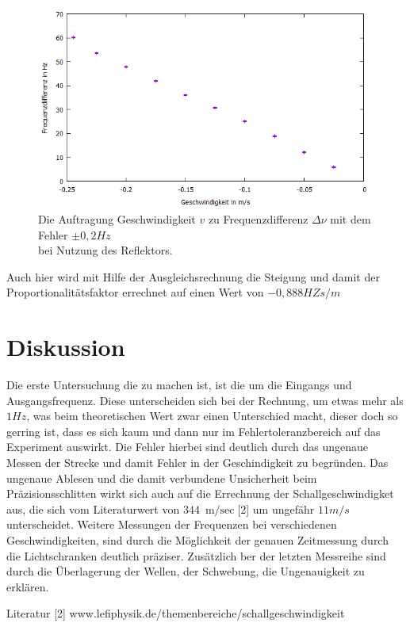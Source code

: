 \newpage
\begin{figure}
  \centering
  \includegraphics[width=\textwidth]{DiagramE.jpg}
  \caption{Die Auftragung Geschwindigkeit $v$ zu Frequenzdifferenz $\Delta\nu$ mit dem Fehler $\pm 0,2 Hz$\\ bei Nutzung des Reflektors.}
  \label{fig:DiaE}
\end{figure}
Auch hier wird mit Hilfe der Ausgleichsrechnung die Steigung und damit der Proportionalitätsfaktor errechnet auf einen Wert von $-0,888 HZ s/m $
\newpage
\section{Diskussion}
Die erste Untersuchung die zu machen ist, ist die um die Eingangs und Ausgangsfrequenz.
Diese unterscheiden sich bei der Rechnung, um etwas mehr als $ 1 Hz$, was beim theoretischen Wert zwar einen Unterschied macht, dieser doch so gerring ist, dass es sich kaum und dann nur im Fehlertoleranzbereich auf das Experiment auswirkt.
Die Fehler hierbei sind deutlich durch das ungenaue Messen der Strecke und damit Fehler in der Geschindigkeit zu begründen.
Das ungenaue Ablesen und die damit verbundene Unsicherheit beim Präzisionsschlitten wirkt sich auch auf die Errechnung der Schallgeschwindigket aus, die sich vom Literaturwert von $\SI{344}{\m\per\sec}$[2] um ungefähr $11 m/s$ unterscheidet.
Weitere Messungen der Frequenzen bei verschiedenen Geschwindigkeiten, sind durch die Möglichkeit der genauen Zeitmessung durch die Lichtschranken deutlich präziser.
Zusätzlich ber der letzten Messreihe sind durch die Überlagerung der Wellen, der Schwebung, die Ungenauigkeit zu erklären.

Literatur
[2] www.lefiphysik.de/themenbereiche/schallgeschwindigkeit

